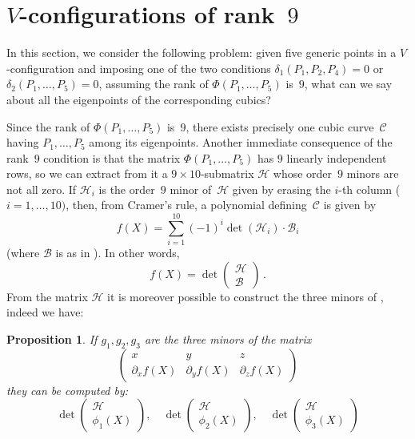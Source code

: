 \documentclass{amsart}
\theoremstyle{plain}
\newtheorem{prop}[lemma]{Proposition}
\theoremstyle{definition}
\newcommand{\de}{\partial}
\newcommand{\cbc}{\ensuremath{\mathcal{C}}}
\begin{document}
\section{\texorpdfstring{$V$}{V}-configurations of rank~\texorpdfstring{$9$}{9}}
\label{rank_9}

In this section, we consider the following problem:
given five generic points in a $V$-configuration and imposing one
of the two conditions
$\delta_1(P_1, P_2, P_4) = 0$ or $\delta_2(P_1, \dots, P_5) = 0$, assuming the rank of $\Phi(P_1, \dots, P_5)$ is~$9$, what can we say about all the eigenpoints of the corresponding cubics?

Since the rank of $\Phi(P_1, \dots, P_5)$ is~$9$, there exists precisely one cubic curve~$\cbc$ having $P_1, \dots, P_5$ among its eigenpoints. Another immediate consequence of the rank~$9$ condition is that the
matrix $\Phi(P_1, \dots, P_5)$ has $9$ linearly independent rows, so
we can extract from it a $9 \times 10$-submatrix
$\mathcal{H}$ whose order~$9$ minors are not all zero. 
If $\mathcal{H}_i$ is the order~$9$ minor of~$\mathcal{H}$ given by erasing the $i$-th column ($i=1, \dots, 10)$, 
then, from Cramer's rule, a polynomial defining~$\cbc$ is given by
%
\[
  f(X) = \sum_{i=1}^{10}(-1)^i\det(\mathcal{H}_i)\cdot \mathcal{B}_i
\]
%
(where $\mathcal{B}$ is as in ). In other words,
%
\[
  f(X) = \det \left( 
  \begin{array}{c} \mathcal{H} \\ \mathcal{B} \end{array}
  \right) \,.
\]
%
From the matrix $\mathcal{H}$ it is moreover possible to construct
the three minors of , indeed we have:
\begin{prop}
\label{proposition:geiser1}
If $g_1, g_2, g_3$ are the three minors of the matrix
%
\[
  \left(
  \begin{array}{ccc}
    x & y & z \\
    \de_x f(X) & \de_y f(X) & \de_z f(X)
  \end{array}
  \right)
\]
%
they can be computed by:
%
\[
  \det \left( 
  \begin{array}{c} \mathcal{H} \\ \phi_1(X) \end{array}
  \right),\quad
  \det \left( 
  \begin{array}{c} \mathcal{H} \\ \phi_2(X) \end{array}
  \right), \quad
  \det \left( 
  \begin{array}{c} \mathcal{H} \\ \phi_3(X) \end{array}
  \right)
\]
%
\end{prop}
\end{document}
